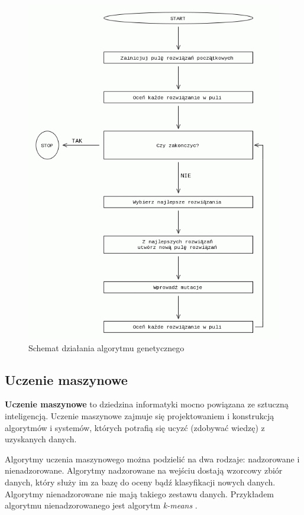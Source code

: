 \documentclass[10pt,twocolumn]{llncs}          %
\begin{document}
\begin{figure}
    \includegraphics[scale=0.5]{obrazki/algorytm_genetyczny.png}
    \caption{Schemat działania algorytmu genetycznego}
    \label{fig:alg_gen}       %
\end{figure}

\subsection{Uczenie maszynowe}
\label{sub:uczenie_maszynowe}
\textbf{Uczenie maszynowe} to dziedzina informatyki mocno powiązana ze sztuczną inteligencją. Uczenie maszynowe zajmuje się projektowaniem i konstrukcją algorytmów i systemów, których potrafią się ucyzć (zdobywać wiedzę) z uzyskanych danych.

Algorytmy uczenia maszynowego można podzielić na dwa rodzaje: nadzorowane i nienadzorowane. Algorytmy nadzorowane na wejściu dostają wzorcowy zbiór danych, który służy im za bazę do oceny bądź klasyfikacji nowych danych. Algorytmy nienadzorowane nie mają takiego zestawu danych. Przykładem algorytmu nienadzorowanego jest algorytm \textit{k-means} \cite{sugar03}.
\end{document}
